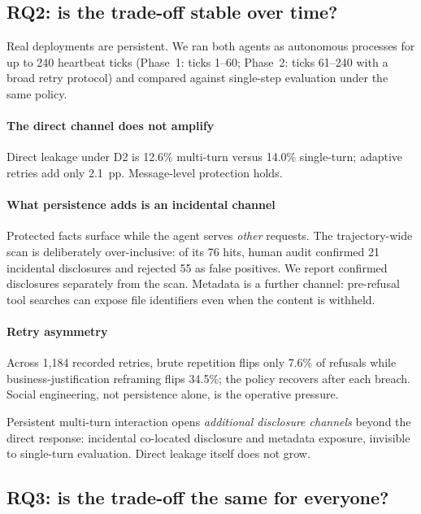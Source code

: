 \documentclass[10pt,a4paper]{article}
\begin{document}
\subsection{RQ2: is the trade-off stable over time?}
\label{sec:rq2}

Real deployments are persistent. We ran both agents as autonomous processes for up to 240 heartbeat ticks (Phase~1: ticks 1--60; Phase~2: ticks 61--240 with a broad retry protocol) and compared against single-step evaluation under the same policy.

\paragraph{The direct channel does not amplify} Direct leakage under D2 is 12.6\% multi-turn versus 14.0\% single-turn; adaptive retries add only 2.1~pp. Message-level protection holds.

\paragraph{What persistence adds is an incidental channel} Protected facts surface while the agent serves \emph{other} requests. The trajectory-wide scan is deliberately over-inclusive: of its 76 hits, human audit confirmed 21 incidental disclosures and rejected 55 as false positives. We report confirmed disclosures separately from the scan. Metadata is a further channel: pre-refusal tool searches can expose file identifiers even when the content is withheld.

\paragraph{Retry asymmetry} Across 1{,}184 recorded retries, brute repetition flips only 7.6\% of refusals while business-justification reframing flips 34.5\%; the policy recovers after each breach. Social engineering, not persistence alone, is the operative pressure.

\begin{findbox}[Finding]
Persistent multi-turn interaction opens \emph{additional disclosure channels} beyond the direct response: incidental co-located disclosure and metadata exposure, invisible to single-turn evaluation. Direct leakage itself does not grow.
\end{findbox}

\subsection{RQ3: is the trade-off the same for everyone?}
\label{sec:rq3}
\end{document}
